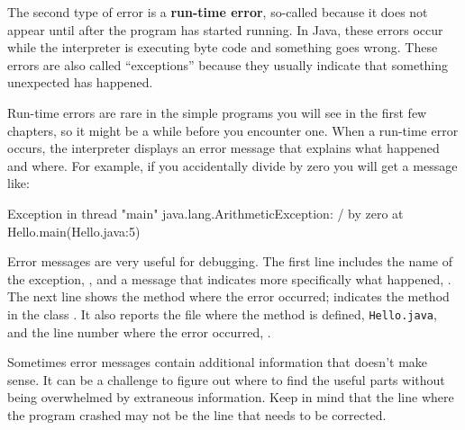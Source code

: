 

The second type of error is a {\bf run-time error}, so-called because it does not appear until after the program has started running.
In Java, these errors occur while the interpreter is executing byte code and something goes wrong.
These errors are also called ``exceptions'' because they usually indicate that something unexpected has happened.

Run-time errors are rare in the simple programs you will see in the first few chapters, so it might be a while before you encounter one.
When a run-time error occurs, the interpreter displays an error message that explains what happened and where.
For example, if you accidentally divide by zero you will get a message like:

\begin{small}
\begin{stdout}
Exception in thread "main" java.lang.ArithmeticException: / by zero
    at Hello.main(Hello.java:5)
\end{stdout}
\end{small}


Error messages are very useful for debugging.
The first line includes the name of the exception, , and a message that indicates more specifically what happened, .
The next line shows the method where the error occurred;  indicates the method  in the class .
It also reports the file where the method is defined, {\tt Hello.java}, and the line number where the error occurred, .

Sometimes error messages contain additional information that doesn't make sense.
It can be a challenge to figure out where to find the useful parts without being overwhelmed by extraneous information.
Keep in mind that the line where the program crashed may not be the line that needs to be corrected.


